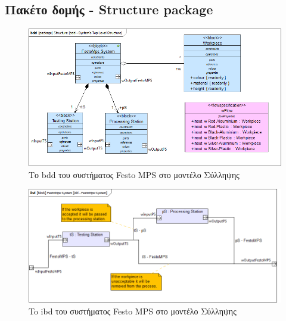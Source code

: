 \documentclass[a4paper,12pt,twoside]{report}
\begin{document}
\begin{appendices}
			\FloatBarrier			
			\subsection{Πακέτο δομής - Structure package}

			\clearpage
				\begin{figure}[hp]
					\centering
					\includegraphics[scale=0.45]{ConceptionalModel_bdd-SystemsTopLevelStructure.png}
					\caption{Το bdd του συστήματος Festo MPS στο μοντέλο Σύλληψης}
					\label{φωτ:Το bdd του συστήματος Festo MPS στο μοντέλο Σύλληψης}
				\end{figure}
				\begin{figure}[hp]
					\centering
					\includegraphics[scale=0.45]{ConceptionalModel_idd-FestoMpsSystem.png}
					\caption{To ibd του συστήματος Festo MPS στο μοντέλο Σύλληψης}
					\label{φωτ:To ibd του συστήματος Festo MPS στο μοντέλο Σύλληψης}
				\end{figure}
			
			\FloatBarrier

\end{appendices}
\end{document}
